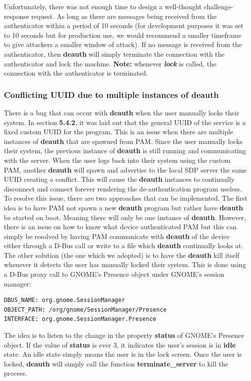 \documentclass[letterpaper,twocolumn,10pt]{article}
\begin{document}
{{Unfortunately, there was not enough time to design a well-thought challenge-response request. As long as there are messages being received from the authenticator within a period of 10 seconds (for development purposes it was set to 10 seconds but for production use, we would recommend a smaller timeframe to give attackers a smaller window of attack). If no message is received from the authenticator, then \textbf{deauth} will simply terminate the connection with the authenticator and lock the machine. \textbf{Note:} whenever \textbf{\emph{lock}} is called, the connection with the authenticator is terminated. 

\subsubsection{Conflicting UUID due to multiple instances of deauth}

There is a bug that can occur with \textbf{deauth} when the user manually locks their system. In section \textbf{5.4.2}, it was laid out that the general UUID of the service is a fixed custom UUID for the program. This is an issue when there are multiple instances of \textbf{deauth} that are spawned from PAM. Since the user manually locks their system, the previous instance of \textbf{deauth} is still running and communicating with the server. When the user logs back into their system using the custom PAM, another \textbf{deauth} will spawn and advertise to the local SDP server the same UUID creating a conflict. This will cause the \textbf{deauth} instances to continually disconnect and connect forever rendering the de-authentication program useless. To resolve this issue, there are two approaches that can be implemented. The first idea is to have PAM not spawn a new \textbf{deauth} program but rather have \textbf{deauth} be started on boot. Meaning there will only be one instance of \textbf{deauth}. However, there is an issue on how to know what device authenticated PAM but this can simply be resolved by having PAM communicate with \textbf{deauth} of the device either through a D-Bus call or write to a file which \textbf{deauth} continually looks at. The other solution (the one which we adopted) is to have the \textbf{deauth} kill itself whenever it detects the user has manually locked their system. This is done using a D-Bus proxy call to GNOME's Presence object under GNOME's session manager:
{\small
\begin{lstlisting}
DBUS_NAME: org.gnome.SessionManager
OBJECT_PATH: /org/gnome/SessionManager/Presence
INTERFACE: org.gnome.SessionManager.Presence
\end{lstlisting}
}
The idea is to listen to the change in the property \textbf{status} of GNOME's Presence object. If the value of \textbf{status} is ever 3, it indicates the user's session is in \textbf{idle} state. An idle state simply means the user is in the lock screen. Once the user is locked, \textbf{deauth} will simply call the function \textbf{terminate\_server} to kill the process.

}}
\end{document}
